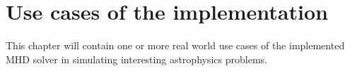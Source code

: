\chapter{Use cases of the implementation}
This chapter will contain one or more real world use cases of the implemented MHD solver in simulating interesting astrophysics problems.
